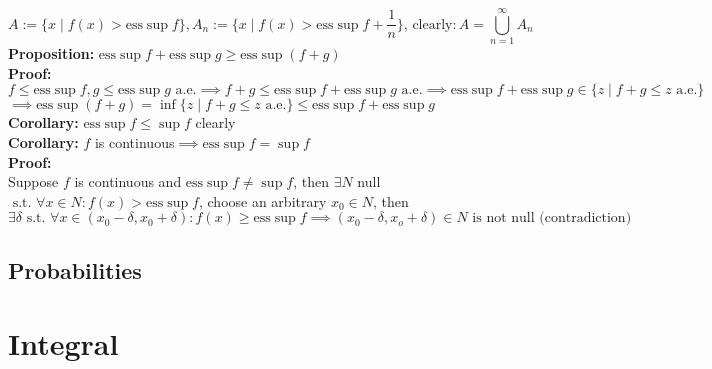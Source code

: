 \documentclass{article}
\newcommand{\cupninf}{\displaystyle\bigcup_{n=1}^\infty}
\newcommand{\st}{\mbox{ s.t. }}
\newcommand{\clear}{\mbox{clearly}:}
\newcommand{\0}{{\bf{0}}}
\newcommand{\1}{{\bf{1}}}
\newcommand{\esssup}{\mbox{ess}\sup\limits}
\newcommand{\alev}{\mbox{ a.e.}}
\begin{document}
$$A:=\{x\mid f(x)>\esssup f\},A_n:=\{x\mid f(x)>\esssup f+\frac{1}{n}\},\,\clear A=\cupninf A_n$$
\textbf{Proposition:} $\esssup f+\esssup g\geq\esssup(f+g)$\\
\textbf{Proof:}\\
$f\le\esssup f,g\le\esssup g\alev\implies f+g\le\esssup f+\esssup g\alev\implies\esssup f+\esssup g\in\{z\mid f+g\le z\alev\}$\\
$\implies\esssup(f+g)=\inf\{z\mid f+g\le z\alev\}\le\esssup f+\esssup g$\\
\textbf{Corollary:} $\esssup f\le\sup f$ clearly\\
\textbf{Corollary:} $f$ is continuous$\implies\esssup f=\sup f$\\
\textbf{Proof:}\\
Suppose $f$ is continuous and $\esssup f\neq\sup f$, then $\exists N$ null$\st\forall x\in N: f(x)>\esssup f$, choose an arbitrary $x_0\in N$, then $\exists\delta\st\forall x\in(x_0-\delta,x_0+\delta):f(x)\geq\esssup f\implies (x_0-\delta,x_o+\delta)\in N\mbox{ is not null (contradiction)}$
\subsection{Probabilities}
\clearpage
\section{Integral}
\end{document}
